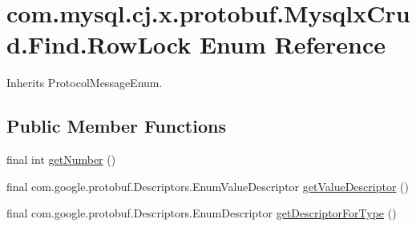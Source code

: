 \hypertarget{enumcom_1_1mysql_1_1cj_1_1x_1_1protobuf_1_1_mysqlx_crud_1_1_find_1_1_row_lock}{}\section{com.\+mysql.\+cj.\+x.\+protobuf.\+Mysqlx\+Crud.\+Find.\+Row\+Lock Enum Reference}
\label{enumcom_1_1mysql_1_1cj_1_1x_1_1protobuf_1_1_mysqlx_crud_1_1_find_1_1_row_lock}


Inherits Protocol\+Message\+Enum.

\subsection*{Public Member Functions}
\begin{DoxyCompactItemize}
\item 
final int \mbox{\hyperlink{enumcom_1_1mysql_1_1cj_1_1x_1_1protobuf_1_1_mysqlx_crud_1_1_find_1_1_row_lock_a498da78d14366366a0fb9db39fffd00a}{get\+Number}} ()
\item 
final com.\+google.\+protobuf.\+Descriptors.\+Enum\+Value\+Descriptor \mbox{\hyperlink{enumcom_1_1mysql_1_1cj_1_1x_1_1protobuf_1_1_mysqlx_crud_1_1_find_1_1_row_lock_ac8daee92f92c75ebc6a0394cc068edd7}{get\+Value\+Descriptor}} ()
\item 
final com.\+google.\+protobuf.\+Descriptors.\+Enum\+Descriptor \mbox{\hyperlink{enumcom_1_1mysql_1_1cj_1_1x_1_1protobuf_1_1_mysqlx_crud_1_1_find_1_1_row_lock_acda587d86247c6a7ea3374b640da3e3a}{get\+Descriptor\+For\+Type}} ()
\end{DoxyCompactItemize}
